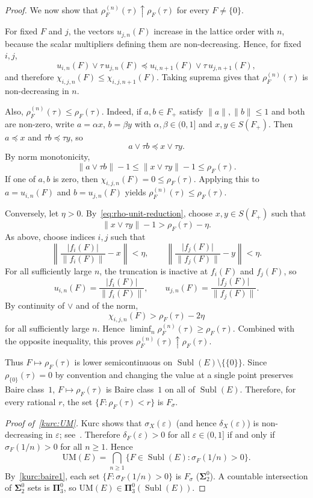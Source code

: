 \documentclass[12pt]{amsart}
\renewcommand{\le}{\leqslant}
\renewcommand{\ge}{\geqslant}
\theoremstyle{plain}
\theoremstyle{definition}
\theoremstyle{remark}
\DeclareMathOperator{\Subl}{Subl}
\begin{document}
\begin{proof}
We now show that
$\rho^{(n)}_F(\tau) \uparrow \rho_F(\tau)$ for every $F \ne \{0\}$.

For fixed $F$ and $j$, the vectors $u_{j,n}(F)$ increase in the lattice order with $n$,
because the scalar multipliers defining them are non-decreasing.
Hence, for fixed $i,j$,
\[
    u_{i,n}(F) \vee \tau\,u_{j,n}(F)
    \preceq
    u_{i,n+1}(F) \vee \tau\,u_{j,n+1}(F),
\]
and therefore
$\chi_{i,j,n}(F) \le \chi_{i,j,n+1}(F)$.
Taking suprema gives that $\rho^{(n)}_F(\tau)$ is non-decreasing in $n$.

Also, $\rho^{(n)}_F(\tau) \le \rho_F(\tau)$.
Indeed, if $a,b \in F_+$ satisfy $\lVert a \rVert,\lVert b \rVert \le 1$ and
both are non-zero, write
$a=\alpha x$, $b=\beta y$ with $\alpha,\beta \in (0,1]$ and
$x,y \in S(F_+)$.
Then $a \preceq x$ and $\tau b \preceq \tau y$, so
\[
    a \vee \tau b \preceq x \vee \tau y.
\]
By norm monotonicity,
\[
    \lVert a \vee \tau b \rVert - 1
    \le \lVert x \vee \tau y \rVert - 1
    \le \rho_F(\tau).
\]
If one of $a,b$ is zero, then
$\chi_{i,j,n}(F)=0 \le \rho_F(\tau)$.
Applying this to
$a=u_{i,n}(F)$ and $b=u_{j,n}(F)$ yields
$\rho^{(n)}_F(\tau) \le \rho_F(\tau)$.

Conversely, let $\eta > 0$.
By~\eqref{eq:rho-unit-reduction}, choose $x,y \in S(F_+)$ such that
\[
    \lVert x \vee \tau y \rVert - 1 > \rho_F(\tau) - \eta.
\]
As above, choose indices $i,j$ such that
\[
    \left\lVert
    \frac{\lvert f_i(F) \rvert}{\lVert f_i(F) \rVert} - x
    \right\rVert < \eta,
    \qquad
    \left\lVert
    \frac{\lvert f_j(F) \rvert}{\lVert f_j(F) \rVert} - y
    \right\rVert < \eta.
\]
For all sufficiently large $n$, the truncation is inactive at $f_i(F)$ and $f_j(F)$, so
\[
    u_{i,n}(F)=\frac{\lvert f_i(F) \rvert}{\lVert f_i(F) \rVert},
    \qquad
    u_{j,n}(F)=\frac{\lvert f_j(F) \rvert}{\lVert f_j(F) \rVert}.
\]
By continuity of $\vee$ and of the norm,
\[
    \chi_{i,j,n}(F) > \rho_F(\tau) - 2\eta
\]
for all sufficiently large $n$.
Hence
$\liminf_n \rho^{(n)}_F(\tau) \ge \rho_F(\tau)$.
Combined with the opposite inequality, this proves
$\rho^{(n)}_F(\tau)\uparrow \rho_F(\tau)$.

Thus $F \mapsto \rho_F(\tau)$ is lower semicontinuous on
$\Subl(E)\setminus\{\{0\}\}$.
Since $\rho_{\{0\}}(\tau)=0$ by convention and changing the value at a single
point preserves Baire class~$1$, $F \mapsto \rho_F(\tau)$ is Baire class~$1$
on all of $\Subl(E)$.
Therefore, for every rational $r$, the set
$\{F \colon \rho_F(\tau) < r\}$ is $F_\sigma$.

\medskip
\emph{Proof of~\ref{kurc:UM}.}
Kurc shows that $\sigma_X(\varepsilon)$ (and hence $\delta_X(\varepsilon)$) is
non-decreasing in $\varepsilon$; see~\cite{Kurc1993Dual}.  Therefore
$\delta_F(\varepsilon) > 0$ for all $\varepsilon \in (0, 1]$ if and only if
$\sigma_F(1/n) > 0$ for all $n \ge 1$.  Hence
\[
    \mathrm{UM}(E) = \bigcap_{n \ge 1}
    \{F \in \Subl(E) \colon \sigma_F(1/n) > 0\}.
\]
By~\ref{kurc:baire1}, each set $\{F \colon \sigma_F(1/n) > 0\}$ is $F_\sigma$
($\boldsymbol{\Sigma}^0_2$).  A countable intersection of
$\boldsymbol{\Sigma}^0_2$ sets is $\boldsymbol{\Pi}^0_3$, so
$\mathrm{UM}(E) \in \boldsymbol{\Pi}^0_3(\Subl(E))$.


\end{proof}
\end{document}
